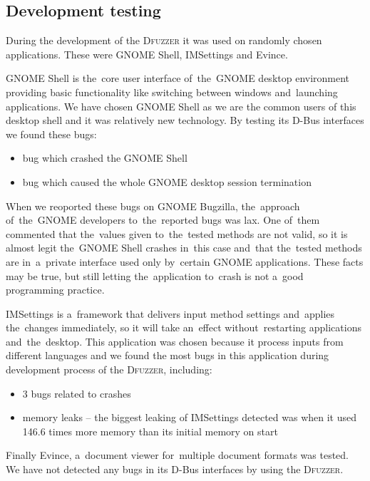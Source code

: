 \documentclass[conference]{IEEEtran}
\begin{document}
\subsection{Development testing}
During the development of the \textsc{Dfuzzer} it was used on randomly chosen applications.
These were GNOME Shell, IMSettings and Evince.

GNOME Shell is the~core user interface of~the~GNOME desktop environment
providing basic functionality like switching between windows and~launching
applications. We have chosen GNOME Shell as we are the common users of this
desktop shell and it was relatively new technology. By testing its D-Bus
interfaces we found these bugs:
\begin{itemize}
	\item bug which crashed the GNOME Shell
	\item bug which caused the whole GNOME desktop session termination
\end{itemize}
When we reoported these bugs on GNOME Bugzilla, the~approach of~the~GNOME
developers to~the~reported bugs was lax. One of~them commented that the~values
given to~the~tested methods are not valid, so it is almost legit
the~GNOME Shell crashes in~this case and~that the~tested methods are
in~a~private interface used only by~certain GNOME applications. These facts may
be true, but still letting the~application to~crash is not a~good programming
practice.

IMSettings is a~framework that delivers input method settings and~applies the~changes
immediately, so it will take an~effect without~restarting applications
and~the~desktop. This application was chosen because it process inputs
from different languages and we found the most bugs in this application during
development process of the \textsc{Dfuzzer}, including:
\begin{itemize}
	\item 3 bugs related to crashes
	\item memory leaks -- the biggest leaking of IMSettings detected was when it
		used 146.6 times more memory than its initial memory on start
\end{itemize}

Finally Evince, a~document viewer for~multiple document formats was tested.
We have not detected any bugs in its D-Bus interfaces by using the \textsc{Dfuzzer}.
\end{document}
